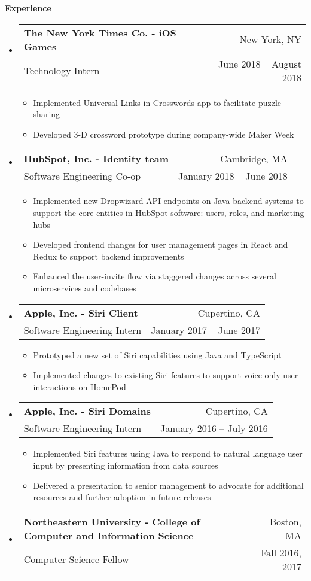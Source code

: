 \documentclass[letterpaper,10pt]{article}
\makeatletter
\newcommand{\resitem}[1]{\item #1 \vspace{-2pt}}
\newcommand{\resheading}[1]{{\large \colorbox{mygrey}{\begin{minipage}{\textwidth}{\textbf{#1 \vphantom{p\^{E}}}}\end{minipage}}}}
\newcommand{\ressubheading}[4]{
\begin{tabular*}{6.8in}{l@{\extracolsep{\fill}}r}
		\textbf{#1} & #2 \\
		\small{#3} & \small{#4} \\
\end{tabular*}\vspace{-6pt}}
\makeatother
\begin{document}
\resheading{Experience}
\begin{itemize}[leftmargin=*]
  \item[]
  \ressubheading{The New York Times Co. - \small{iOS Games}}{New York, NY}{Technology Intern}{June 2018 -- August 2018}
  {\footnotesize
    \begin{itemize}
	  \resitem{Implemented Universal Links in Crosswords app to facilitate puzzle sharing}
	  \resitem{Developed 3-D crossword prototype during company-wide Maker Week}
  \end{itemize}}
  \item[]
  \ressubheading{HubSpot, Inc. - \small{Identity team}}{Cambridge, MA}{Software Engineering Co-op}{January 2018 -- June 2018}
  {\footnotesize
    \begin{itemize}
      \resitem{Implemented new Dropwizard API endpoints on Java backend systems to support the core entities in HubSpot software: users, roles, and marketing hubs}
      \resitem{Developed frontend changes for user management pages in React and Redux to support backend improvements}
      \resitem{Enhanced the user-invite flow via staggered changes across several microservices and codebases}
  \end{itemize}}
	\item[]
	\ressubheading{Apple, Inc. - \small{Siri Client}}{Cupertino, CA}{Software Engineering Intern}{January 2017 -- June 2017}
	{\footnotesize
		\begin{itemize}
			\resitem{Prototyped a new set of Siri capabilities using Java and TypeScript}
			\resitem{Implemented changes to existing Siri features to support voice-only user interactions on HomePod}
	\end{itemize}}
	\item[]
	\ressubheading{Apple, Inc. - \small{Siri Domains}}{Cupertino, CA}{Software Engineering Intern}{January 2016 -- July 2016}
	{\footnotesize
		\begin{itemize}
			\resitem{Implemented Siri features using Java to respond to natural language user input by presenting information from data sources}
			\resitem{Delivered a presentation to senior management to advocate for additional resources and further adoption in future releases}
	\end{itemize}}
	\item[]
	\ressubheading{Northeastern University - \small{College of Computer and Information Science}}{Boston, MA}{Computer Science Fellow}{Fall 2016, 2017}
	{\footnotesize
		\begin{itemize}

\end{itemize}}
\end{itemize}
\end{document}
